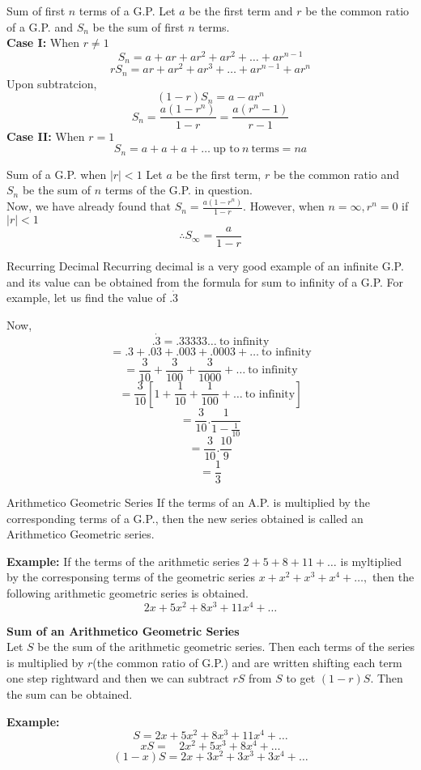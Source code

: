 \documentclass[aspectratio=169,8pt]{beamer}
\begin{document}
\begin{frame}{Sum of first $n$ terms of a G.P.}
  Let $a$ be the first term and $r$ be the common ratio of a G.P. and $S_n$ be
  the sum of first $n$ terms.\\
  \vspace{0.3cm}
  \textbf{Case I:} When $r \ne 1$\\
  $$S_n = a + ar + ar^2 + ar^2 + \ldots + ar^{n - 1}$$
  $$rS_n = ar + ar^2 + ar^3 + \ldots + ar^{n - 1} + ar^n$$
  Upon subtratcion,
  $$(1 - r)S_n = a - ar^n$$
  $$S_n = \frac{a(1 - r^n)}{1 - r} = \frac{a(r^n - 1)}{r - 1}$$
  \textbf{Case II:} When $r = 1$\\
  $$S_n = a + a + a + \ldots~\text{up to}~n~\text{terms} = na$$
\end{frame}
\begin{frame}{Sum of a G.P. when $|r| < 1$}
  Let $a$ be the first term, $r$ be the common ratio and $S_n$ be the sum of
  $n$ terms of the G.P. in question.\\
  \vspace{.3cm}
  Now, we have already found that $S_n = \frac{a(1 - r^n)}{1 - r}$. However,
  when $n = \infty, r^n = 0$ if $|r| < 1$\\
  \vspace{.3cm}
  $$\therefore S_{\infty} = \frac{a}{1 - r}$$
\end{frame}
\begin{frame}{Recurring Decimal}
  Recurring decimal is a very good example of an infinite G.P. and its value
  can be obtained from the formula for sum to infinity of a G.P. For example,
  let us find the value of $.\dot{3}$

  Now, $$.\dot{3} = .33333 \ldots~\text{to infinity}$$
  $$= .3 + .03 + .003 + .0003 + \ldots~\text{to infinity}$$
  $$= \frac{3}{10} + \frac{3}{100} + \frac{3}{1000} + \ldots~\text{to infinity}$$
  $$= \frac{3}{10}\left[1 + \frac{1}{10} + \frac{1}{100} + \ldots~\text{to
      infinity}\right]$$
  $$= \frac{3}{10}.\frac{1}{1 - \frac{1}{10}}$$
  $$= \frac{3}{10}.\frac{10}{9}$$
  $$= \frac{1}{3}$$
\end{frame}
\begin{frame}{Arithmetico Geometric Series}
  If the terms of an A.P. is multiplied by the corresponding terms of a G.P.,
  then the new series obtained is called an Arithmetico Geometric series.

  \textbf{Example: } If the terms of the arithmetic series $2 + 5 + 8 + 11 +
  \ldots$ is myltiplied by the corresponsing terms of the geometric series
  $x + x^2 + x^3 + x^4 + \ldots,$ then the following arithmetic geometric
  series is obtained.
  $$2x + 5x^2 + 8x^3 + 11x^4 + \ldots$$

  \textbf{Sum of an Arithmetico Geometric Series}\\
  Let $S$ be the sum of the arithmetic geometric series. Then each terms of the
  series is multiplied by $r$(the common ratio of G.P.) and are written
  shifting each term one step rightward and then we can subtract $rS$ from $S$
  to get $(1 - r)S$. Then the sum can be obtained.

  \textbf{Example:}$$S = 2x + 5x^2 + 8x^3 + 11x^4 + \ldots$$
  $$xS = ~~~~2x^2 + 5x^3 + 8x^4 + \ldots$$
  $$(1 - x)S = 2x + 3x^2 + 3x^3 + 3x^4 + \ldots$$
\end{frame}
\end{document}
